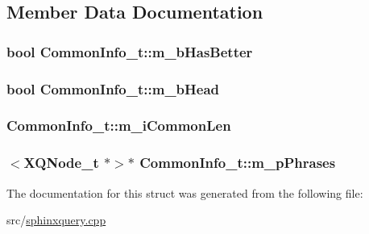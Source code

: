 \subsection{Member Data Documentation}
\hypertarget{structCommonInfo__t_aaefa7a1bca31561afa9edb9e0ea2bd8d}{
\subsubsection[{m\-\_\-b\-Has\-Better}]{\setlength{\rightskip}{0pt plus 5cm}bool Common\-Info\-\_\-t\-::m\-\_\-b\-Has\-Better}}\label{structCommonInfo__t_aaefa7a1bca31561afa9edb9e0ea2bd8d}
\hypertarget{structCommonInfo__t_a3f0b92eb2f401f81170bf59770abccdf}{
\subsubsection[{m\-\_\-b\-Head}]{\setlength{\rightskip}{0pt plus 5cm}bool Common\-Info\-\_\-t\-::m\-\_\-b\-Head}}\label{structCommonInfo__t_a3f0b92eb2f401f81170bf59770abccdf}
\hypertarget{structCommonInfo__t_ab04e7c9b29ef5966442bfc7c93e3c17f}{
\subsubsection[{m\-\_\-i\-Common\-Len}]{ Common\-Info\-\_\-t\-::m\-\_\-i\-Common\-Len}}\label{structCommonInfo__t_ab04e7c9b29ef5966442bfc7c93e3c17f}
\hypertarget{structCommonInfo__t_a59579ef0b59de6030ad2953fca3066f2}{
\subsubsection[{m\-\_\-p\-Phrases}]{$<${\bf X\-Q\-Node\-\_\-t} $\ast$$>$$\ast$ Common\-Info\-\_\-t\-::m\-\_\-p\-Phrases}}\label{structCommonInfo__t_a59579ef0b59de6030ad2953fca3066f2}


The documentation for this struct was generated from the following file\-:\begin{DoxyCompactItemize}
\item 
src/\hyperlink{sphinxquery_8cpp}{sphinxquery.\-cpp}\end{DoxyCompactItemize}
